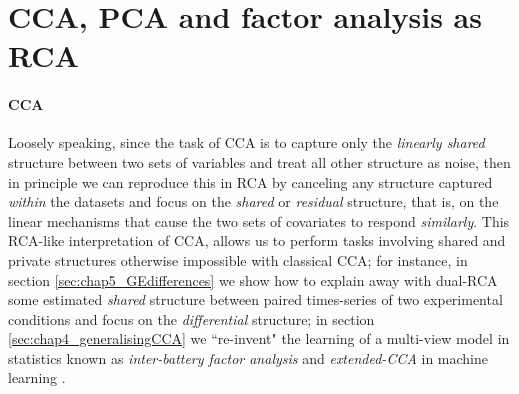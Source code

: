   \section{CCA, PCA and factor analysis as RCA} \label{sec:chap4_CCAasRCA}
    
      \paragraph{CCA}
      Loosely speaking, since the task of CCA is to capture only the \emph{linearly shared} structure between two sets of variables and treat all other structure as noise, then in principle we can reproduce this in RCA by canceling any structure captured \emph{within} the datasets and focus on the \textit{shared} or \textit{residual} structure, that is, on the linear mechanisms that cause the two sets of covariates to respond \textit{similarly}.
      This RCA-like interpretation of CCA, allows us to perform tasks involving shared and private structures otherwise impossible with classical CCA; for instance, in section \ref{sec:chap5_GEdifferences} we show how to explain away with dual-RCA some estimated \emph{shared} structure between paired times-series of two experimental conditions and focus on the \emph{differential} structure; in section \ref{sec:chap4_generalisingCCA} we ``re-invent" the learning of a multi-view model in statistics known as \textit{inter-battery factor analysis} \citep[IBFA,][]{Tucker:interbattery58, Browne:maximum79} and \textit{extended-CCA} in machine learning \citep{Klami:dependencies08,Klami:generative06}.

